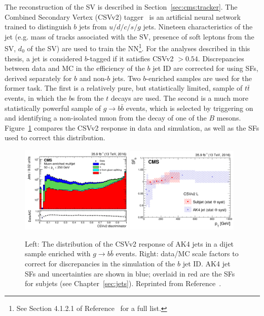 The reconstruction of the SV is described in Section~\ref{sec:cms:tracker}.
The Combined Secondary Vertex (CSVv2) tagger~\cite{csvv2} is an artificial neural network trained to distinguish $b$ jets from $u/d/c/s/g$ jets. 
Nineteen characteristics of the jet (e.g. mass of tracks associated with the SV, presence of soft leptons from the SV, $d_0$ of the SV) are used to train the NN\footnote{See Section 4.1.2.1 of Reference~\cite{csvv2} for a full list.}.
For the analyses described in this thesis, a jet is considered $b$-tagged if it satisfies CSVv2 $>0.54$. 
Discrepancies between data and MC in the efficiency of the $b$ jet ID are corrected for using SFs, derived separately for $b$ and non-$b$ jets.
Two $b$-enriched samples are used for the former task.
The first is a relatively pure, but statistically limited, sample of $t\bar{t}$ events, in which the $b$s from the $t$ decays are used.
The second is a much more statistically powerful sample of $g\rightarrow b\bar{b}$ events, which is selected by triggering on and identifying a non-isolated muon from the decay of one of the $B$ mesons. 
Figure~\ref{fig:cms:csvv2} compares the CSVv2 response in data and simulation, as well as the SFs used to correct this distribution.

\begin{figure}[]
\begin{center}
	\includegraphics[width=0.48\textwidth]{figures/cms/csvv2.png}
	\includegraphics[width=0.48\textwidth]{figures/cms/csvsf.png}
	\caption{Left: The distribution of the CSVv2 response of AK4 jets in a dijet sample enriched with $g\rightarrow b\bar{b}$ events.
			 Right: data/MC scale factors to correct for discrepancies in the simulation of the $b$ jet ID.
			 AK4 jet SFs and uncertainties are shown in blue; overlaid in red are the SFs for subjets (see Chapter~\ref{sec:jets}).
			 Reprinted from Reference~\cite{csvv2}.}
	\label{fig:cms:csvv2}
\end{center}
\end{figure}


